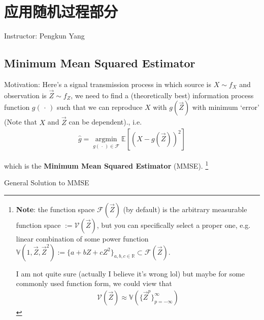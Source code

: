 \section{应用随机过程部分}
\begin{center}
    Instructor: Pengkun Yang 
\end{center}

    





\subsection{Minimum Mean Squared Estimator}\label{SubSecMMSE}
    Motivation: Here's a signal transmission process in which source is $ X\sim f_{X} $ and observation is $ \vec{Z}\sim f_Z $, we need to find a (theoretically best) information process function $ g(\, \cdot \, ) $ such that we can reproduce $ X $ with $ g(\vec{Z}) $ with minimum `error' (Note that $ X$ and $\vec{Z} $ can be dependent)., i.e.
    \begin{align*}
        \hat{g}=\mathop{\arg\min}\limits_{g(\, \cdot \, )\in \mathscr{F}} \mathbb{E}\left[ (X-g(\vec{Z}))^2 \right] 
    \end{align*}

    which is the \textbf{Minimum Mean Squared Estimator} (MMSE). \footnote{\textbf{Note}: the function space $ \mathscr{F}(\vec{Z}) $ (by default) is the arbitrary measurable function space $ :=\mathscr{V}(\vec{Z}) $, but you can specifically select a proper one, e.g. linear combination of some power function $ \mathbb{V}(1,\vec{Z},\vec{Z}^2):=\{a+bZ+cZ^2\}_{a,b,c\in\mathbb{R}}\subset \mathscr{F}(\vec{Z}) $.
    
    I am not quite sure (actually I believe it's wrong lol) but maybe for some commonly used function form, we could view that
    \begin{align*}
        \mathscr{V}(\vec{Z})\approx \mathbb{V}(\{\vec{Z}^p\}_{p=-\infty}^\infty) 
    \end{align*}
    
    }

\begin{point}
    General Solution to MMSE
\end{point}

